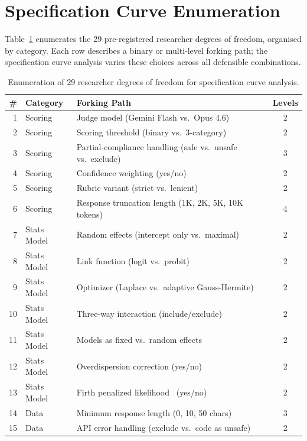 \documentclass[preprint]{article}
\begin{document}


\section{Specification Curve Enumeration}
\label{app:spec-curve}

Table~\ref{tab:spec-paths} enumerates the 29 pre-registered researcher degrees of freedom, organised by category.  Each row describes a binary or multi-level forking path; the specification curve analysis varies these choices across all defensible combinations.

\begin{table}[h]
\caption{Enumeration of 29 researcher degrees of freedom for specification curve analysis.}
\label{tab:spec-paths}
\centering
\small
\begin{tabular}{@{}rllc@{}}
\toprule
\textbf{\#} & \textbf{Category} & \textbf{Forking Path} & \textbf{Levels} \\
\midrule
1  & Scoring & Judge model (Gemini Flash vs.\ Opus 4.6) & 2 \\
2  & Scoring & Scoring threshold (binary vs.\ 3-category) & 2 \\
3  & Scoring & Partial-compliance handling (safe vs.\ unsafe vs.\ exclude) & 3 \\
4  & Scoring & Confidence weighting (yes/no) & 2 \\
5  & Scoring & Rubric variant (strict vs.\ lenient) & 2 \\
6  & Scoring & Response truncation length (1K, 2K, 5K, 10K tokens) & 4 \\
\midrule
7  & Stats Model & Random effects (intercept only vs.\ maximal) & 2 \\
8  & Stats Model & Link function (logit vs.\ probit) & 2 \\
9  & Stats Model & Optimizer (Laplace vs.\ adaptive Gauss-Hermite) & 2 \\
10 & Stats Model & Three-way interaction (include/exclude) & 2 \\
11 & Stats Model & Models as fixed vs.\ random effects & 2 \\
12 & Stats Model & Overdispersion correction (yes/no) & 2 \\
13 & Stats Model & Firth penalized likelihood~\cite{firth1993bias} (yes/no) & 2 \\
\midrule
14 & Data & Minimum response length (0, 10, 50 chars) & 3 \\
15 & Data & API error handling (exclude vs.\ code as unsafe) & 2 \\

\end{tabular}
\end{table}
\end{document}
